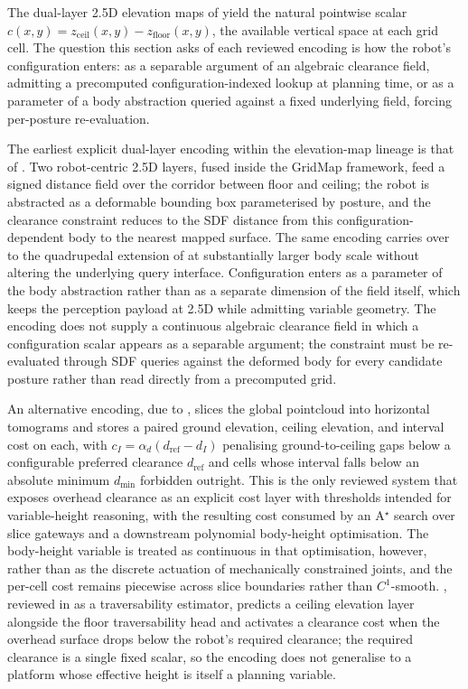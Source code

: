\documentclass[11pt,a4paper]{article}
\begin{document}
The dual-layer 2.5D elevation maps of  yield the natural pointwise scalar $c(x,y) = z_{\text{ceil}}(x,y) - z_{\text{floor}}(x,y)$, the available vertical space at each grid cell. The question this section asks of each reviewed encoding is how the robot's configuration enters: as a separable argument of an algebraic clearance field, admitting a precomputed configuration-indexed lookup at planning time, or as a parameter of a body abstraction queried against a fixed underlying field, forcing per-posture re-evaluation.

The earliest explicit dual-layer encoding within the elevation-map lineage is that of \citet{buchananWalkingPostureAdaptation2019}. Two robot-centric 2.5D layers, fused inside the GridMap framework, feed a signed distance field over the corridor between floor and ceiling; the robot is abstracted as a deformable bounding box parameterised by posture, and the clearance constraint reduces to the SDF distance from this configuration-dependent body to the nearest mapped surface. The same encoding carries over to the quadrupedal extension of \citet{PerceptiveWholebodyPlanning} at substantially larger body scale without altering the underlying query interface. Configuration enters as a parameter of the body abstraction rather than as a separate dimension of the field itself, which keeps the perception payload at 2.5D while admitting variable geometry. The encoding does not supply a continuous algebraic clearance field in which a configuration scalar appears as a separable argument; the constraint must be re-evaluated through SDF queries against the deformed body for every candidate posture rather than read directly from a precomputed grid.

An alternative encoding, due to \citet{yangEfficientGlobalNavigational2024}, slices the global pointcloud into horizontal tomograms and stores a paired ground elevation, ceiling elevation, and interval cost on each, with $c_I = \alpha_d(d_{\text{ref}} - d_I)$ penalising ground-to-ceiling gaps below a configurable preferred clearance $d_{\text{ref}}$ and cells whose interval falls below an absolute minimum $d_{\text{min}}$ forbidden outright. This is the only reviewed system that exposes overhead clearance as an explicit cost layer with thresholds intended for variable-height reasoning, with the resulting cost consumed by an A$^\star$ search over slice gateways and a downstream polynomial body-height optimisation. The body-height variable is treated as continuous in that optimisation, however, rather than as the discrete actuation of mechanically constrained joints, and the per-cell cost remains piecewise across slice boundaries rather than $C^1$-smooth. \citet{mengTerrainNetVisualModeling2023}, reviewed in  as a traversability estimator, predicts a ceiling elevation layer alongside the floor traversability head and activates a clearance cost when the overhead surface drops below the robot's required clearance; the required clearance is a single fixed scalar, so the encoding does not generalise to a platform whose effective height is itself a planning variable.
\end{document}
